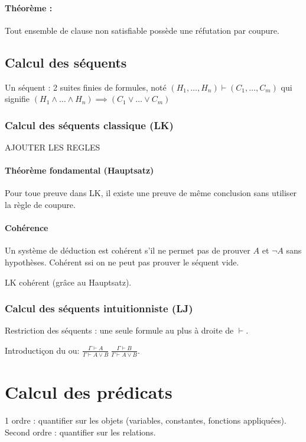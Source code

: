 \documentclass[french]{article}
\begin{document}
\paragraph{Théorème :} Tout ensemble de clause non satisfiable possède une réfutation par coupure.

\subsection{Calcul des séquents}
Un séquent : 2 suites finies de formules, noté  $(H_1,\dots , H_n)\vdash (C_1,\dots , C_m)$ qui signifie $(H_1\wedge\dots\wedge H_n)\implies (C_1\vee\dots\vee C_m)$

\subsubsection{Calcul des séquents classique (LK)}
AJOUTER LES REGLES

\paragraph{Théorème fondamental (Hauptsatz)}
Pour toue preuve dans LK, il existe une preuve de même conclusion sans utiliser la règle de coupure.

\paragraph{Cohérence} Un système de déduction est cohérent s'il ne permet pas de prouver $A$ et $\neg A$ sans hypothèses. Cohérent ssi on ne peut pas prouver le séquent vide.

LK cohérent (grâce au Hauptsatz).

\subsubsection{Calcul des séquents intuitionniste (LJ)}
Restriction des séquents : une seule formule au plus à droite de $\vdash$.

Introductiçon du ou:
$\frac{\Gamma\vdash A}{\Gamma\vdash A\vee B}\ \frac{\Gamma\vdash B}{\Gamma\vdash A\vee B}$.

\section{Calcul des prédicats}
1 ordre : quantifier sur les objets (variables, constantes, fonctions appliquées). Second ordre : quantifier sur les relations.
\end{document}
